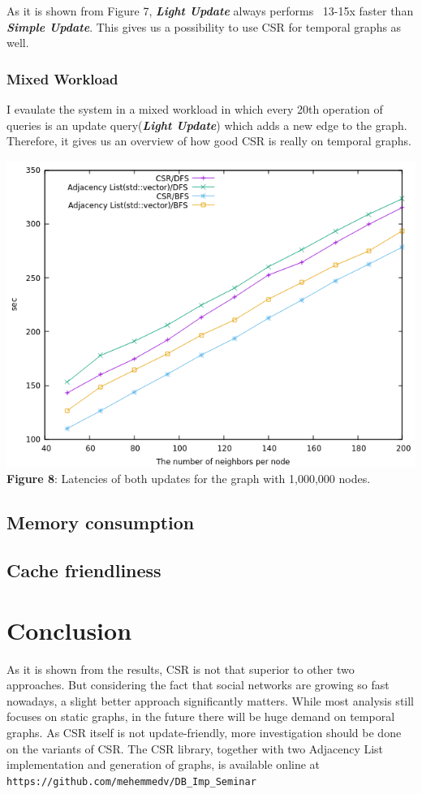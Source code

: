 \documentclass{article}
\begin{document}
 As it is shown from Figure 7, \textbf{\textit{Light Update}} always performs ~13-15x faster than \textbf{\textit{Simple Update}}. This gives us a possibility to use CSR for temporal graphs as well.
 
 \subsubsection*{Mixed Workload}
 I evaulate the system in a mixed workload in which every 20th operation of queries is an update query(\textbf{\textit{Light Update}}) which adds a new edge to the graph. Therefore, it gives us an overview of how good CSR is really on temporal graphs.
 \begin{center}
\includegraphics[scale = 0.5]{mixed_workload}\\
\textbf{Figure 8}: Latencies of both updates for the graph with 1,000,000 nodes.
\end{center}

\subsection{Memory consumption}

\subsection{Cache friendliness}

\section{Conclusion}
As it is shown from the results, CSR is not that superior to other two approaches. But considering the fact that social networks are growing so fast nowadays, a slight better approach significantly matters. While most analysis still focuses on static graphs, in the future there will be huge demand on temporal graphs. As CSR itself is not update-friendly, more investigation should be done on the variants of CSR. The CSR library, together with two Adjacency List implementation and generation of graphs, is available online at \texttt{https://github.com/mehemmedv/DB\_Imp\_Seminar}\\
\end{document}
